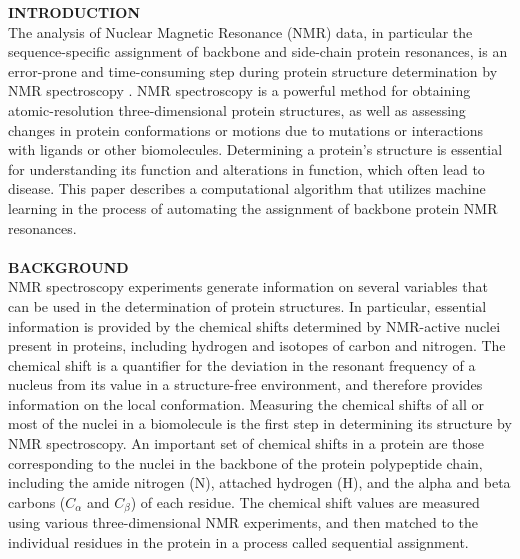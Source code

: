 \documentclass{article}
\begin{document}
\noindent \textbf{INTRODUCTION}\\
The analysis of Nuclear Magnetic Resonance (NMR) data, in particular the sequence-specific assignment of backbone and side-chain protein resonances, is an error-prone and time-consuming step during protein structure determination by NMR spectroscopy \cite{aria}. NMR spectroscopy is a powerful method for obtaining atomic-resolution three-dimensional protein structures, as well as assessing changes in protein conformations or motions due to mutations or interactions with ligands or other biomolecules. Determining a protein’s structure is essential for understanding its function and alterations in function, which often lead to disease. This paper describes a computational algorithm that utilizes machine learning in the process of automating the assignment of backbone protein NMR resonances.
\\\\
\noindent \textbf{BACKGROUND}\\
NMR spectroscopy experiments generate information on several variables that can be used in the determination of protein structures. In particular, essential information is provided by the chemical shifts determined by NMR-active nuclei present in proteins, including hydrogen and isotopes of carbon and nitrogen. The chemical shift is a quantifier for the deviation in the resonant frequency of a nucleus from its value in a structure-free environment, and therefore provides information on the local conformation. Measuring the chemical shifts of all or most of the nuclei in a biomolecule is the first step in determining its structure by NMR spectroscopy. An important set of chemical shifts in a protein are those corresponding to the nuclei in the backbone of the protein polypeptide chain, including the amide nitrogen (N), attached hydrogen (H), and the alpha and beta carbons ($C_\alpha$ and $C_\beta$) of each residue. The chemical shift values are measured using various three-dimensional NMR experiments, and then matched to the individual residues in the protein in a process called sequential assignment.	
\end{document}
